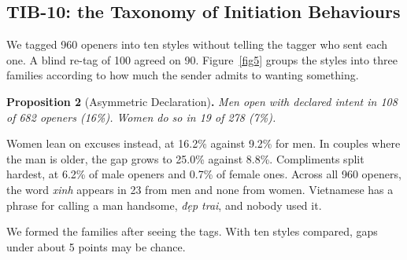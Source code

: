 \documentclass[10pt,letterpaper]{article}
\begin{document}
\subsection{TIB-10: the Taxonomy of Initiation Behaviours}
We tagged 960 openers into ten styles without telling the tagger who sent each one. A blind re-tag of 100 agreed on 90. Figure~\ref{fig5} groups the styles into three families according to how much the sender admits to wanting something.

\textbf{Proposition 2} (Asymmetric Declaration)\textbf{.} \emph{Men open with declared intent in 108 of 682 openers (16\%). Women do so in 19 of 278 (7\%).}

Women lean on excuses instead, at 16.2\% against 9.2\% for men. In couples where the man is older, the gap grows to 25.0\% against 8.8\%. Compliments split hardest, at 6.2\% of male openers and 0.7\% of female ones. Across all 960 openers, the word \emph{xinh} appears in 23 from men and none from women. Vietnamese has a phrase for calling a man handsome, \emph{đẹp trai}, and nobody used it.

We formed the families after seeing the tags. With ten styles compared, gaps under about 5 points may be chance.
\end{document}
